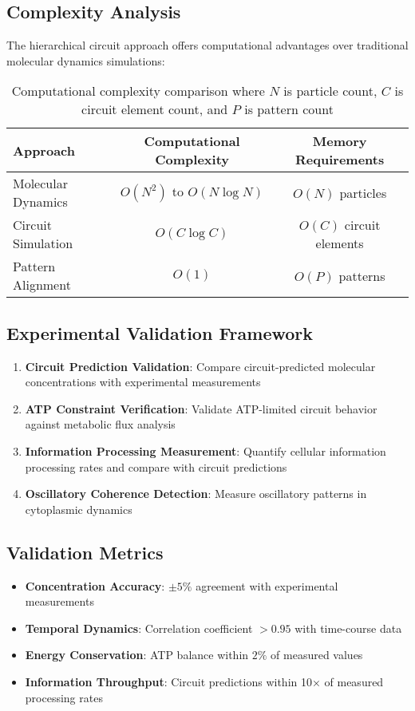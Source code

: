 \documentclass[12pt,a4paper]{article}
\begin{document}
\subsection{Complexity Analysis}

The hierarchical circuit approach offers computational advantages over traditional molecular dynamics simulations:

\begin{table}[H]
\centering
\begin{tabular}{lcc}
\toprule
Approach & Computational Complexity & Memory Requirements \\
\midrule
Molecular Dynamics & $O(N^2)$ to $O(N \log N)$ & $O(N)$ particles \\
Circuit Simulation & $O(C \log C)$ & $O(C)$ circuit elements \\
Pattern Alignment & $O(1)$ & $O(P)$ patterns \\
\bottomrule
\end{tabular}
\caption{Computational complexity comparison where $N$ is particle count, $C$ is circuit element count, and $P$ is pattern count}
\end{table}

\subsection{Experimental Validation Framework}

\begin{enumerate}
\item \textbf{Circuit Prediction Validation}: Compare circuit-predicted molecular concentrations with experimental measurements
\item \textbf{ATP Constraint Verification}: Validate ATP-limited circuit behavior against metabolic flux analysis
\item \textbf{Information Processing Measurement}: Quantify cellular information processing rates and compare with circuit predictions
\item \textbf{Oscillatory Coherence Detection}: Measure oscillatory patterns in cytoplasmic dynamics
\end{enumerate}

\subsection{Validation Metrics}

\begin{itemize}
\item \textbf{Concentration Accuracy}: $\pm 5\%$ agreement with experimental measurements
\item \textbf{Temporal Dynamics}: Correlation coefficient $> 0.95$ with time-course data
\item \textbf{Energy Conservation}: ATP balance within $2\%$ of measured values
\item \textbf{Information Throughput}: Circuit predictions within 10× of measured processing rates
\end{itemize}
\end{document}
